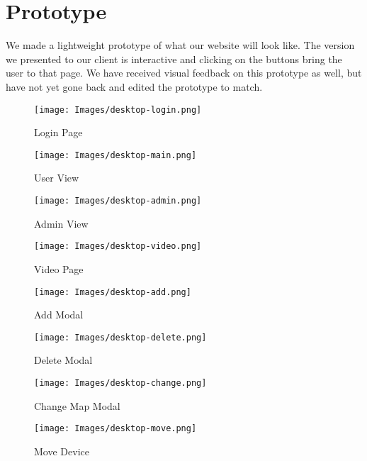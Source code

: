 \documentclass[onecolumn, draftclsnofoot,10pt, compsoc]{IEEEtran}
\begin{document}
\section{Prototype}
        We made a lightweight prototype of what our website will look like. The version we presented to our client is interactive and clicking on the buttons bring the user to that page. We have received visual feedback on this prototype as well, but have not yet gone back and edited the prototype to match.
        \begin{figure}[H]
            \centering
            \captionsetup{justification=centering,margin=2cm}
            \texttt{[image: Images/desktop-login.png]}
            \centering\caption{Login Page}
            \label{fig:Login}
        \end{figure}
        \begin{figure}[H]
            \centering
            \captionsetup{justification=centering,margin=2cm}
            \texttt{[image: Images/desktop-main.png]}
            \centering\caption{User View}
            \label{fig:User}
        \end{figure}
        \begin{figure}[H]
            \centering
            \captionsetup{justification=centering,margin=2cm}
            \texttt{[image: Images/desktop-admin.png]}
            \centering\caption{Admin View}
            \label{fig:Admin}
        \end{figure}
        \begin{figure}[H]
            \centering
            \captionsetup{justification=centering,margin=2cm}
            \texttt{[image: Images/desktop-video.png]}
            \centering\caption{Video Page}
            \label{fig:Video}
        \end{figure}
        \begin{figure}[H]
            \centering
            \captionsetup{justification=centering,margin=2cm}
            \texttt{[image: Images/desktop-add.png]}
            \centering\caption{Add Modal}
            \label{fig:Add}
        \end{figure}
        \begin{figure}[H]
            \centering
            \captionsetup{justification=centering,margin=2cm}
            \texttt{[image: Images/desktop-delete.png]}
            \centering\caption{Delete Modal}
            \label{fig:Delete}
        \end{figure}
        \begin{figure}[H]
            \centering
            \captionsetup{justification=centering,margin=2cm}
            \texttt{[image: Images/desktop-change.png]}
            \centering\caption{Change Map Modal}
            \label{fig:Change}
        \end{figure}
        \begin{figure}[H]
            \centering
            \captionsetup{justification=centering,margin=2cm}
            \texttt{[image: Images/desktop-move.png]}
            \centering\caption{Move Device}
            \label{fig:Move}
        \end{figure}
\end{document}
